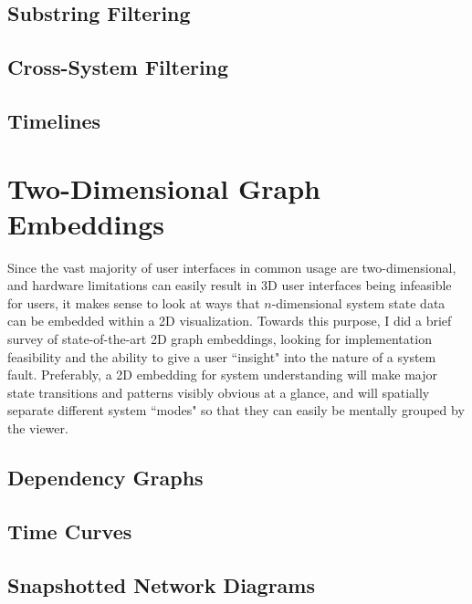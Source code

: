\subsection{Substring Filtering}

\subsection{Cross-System Filtering}

\subsection{Timelines}


\section{Two-Dimensional Graph Embeddings}

Since the vast majority of user interfaces in common usage are two-dimensional, and hardware limitations can easily result in 3D user interfaces being infeasible for users, it makes sense to look at ways that $n$-dimensional system state data can be embedded within a 2D visualization. Towards this purpose, I did a brief survey of state-of-the-art 2D graph embeddings, looking for implementation feasibility and the ability to give a user ``insight" into the nature of a system fault. Preferably, a 2D embedding for system understanding will make major state transitions and patterns visibly obvious at a glance, and will spatially separate different system ``modes" so that they can easily be mentally grouped by the viewer.

\subsection{Dependency Graphs}

\subsection{Time Curves}

\subsection{Snapshotted Network Diagrams}

\subsection{}




